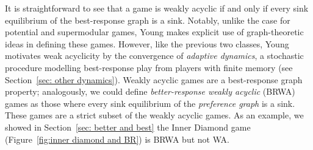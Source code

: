 \documentclass[preprint,authoryear]{elsarticle}
\begin{document}
It is straightforward to see that a game is weakly acyclic if and only if every sink equilibrium of the best-response graph is a sink. Notably, unlike the case for potential and supermodular games, Young makes explicit use of graph-theoretic ideas in defining these games. However, like the previous two classes, Young motivates weak acyclicity by the convergence of \emph{adaptive dynamics}, a stochastic procedure modelling best-response play from players with finite memory (see Section~\ref{sec: other dynamics}). Weakly acyclic games are a best-response graph property; analogously, we could define \emph{better-response weakly acyclic} (BRWA) games as those where every sink equilibrium of the \emph{preference graph} is a sink. These games are a strict subset of the weakly acyclic games. As an example, we showed in Section~\ref{sec: better and best} the Inner Diamond game (Figure~\ref{fig:inner diamond and BR}) is BRWA but not WA.
\begin{comment}
    Weakly acyclic games generalise both ordinal potential and quasi-supermodular games.

\begin{lem}
    Ordinal potential, quasi-supermodular and dominance-solvable games are weakly acyclic.
\end{lem}
\begin{proof}
    Weakly acyclic games are those where the sink equilibria of the best-response graph are PNEs, by Lemma~\ref{lem: weakly acyclic}. In ordinal potential games, the preference graph is acyclic, implying the best-response graph is also acyclic, and hence each best-response sink equilibrium is a PNE. Dominance-solvable games likewise have best-response paths to the dominance solution. More generally, there always exists a best-response path to the subgame of serially undominated strategies. By Theorem~\ref{QSM theorem}, there are strategies $\underbar{s}_p$ and $\bar{s}_p$ for each player which span the set of undominated strategies. In particular, from any profile in this subgame there is a best-\todo{finish}
\end{proof}
\end{comment}
\end{document}
